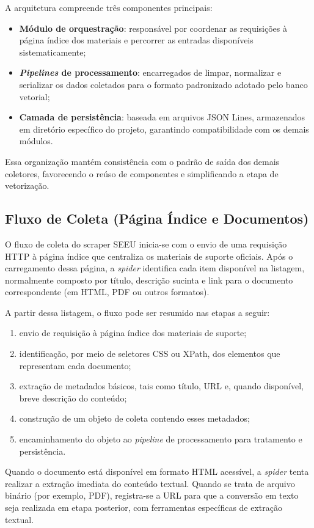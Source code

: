 A arquitetura compreende três componentes principais:
\begin{itemize}
  \item \textbf{Módulo de orquestração}: responsável por coordenar as requisições à página índice dos materiais e percorrer as entradas disponíveis sistematicamente;
  \item \textbf{\textit{Pipelines} de processamento}: encarregados de limpar, normalizar e serializar os dados coletados para o formato padronizado adotado pelo banco vetorial;
  \item \textbf{Camada de persistência}: baseada em arquivos JSON Lines, armazenados em diretório específico do projeto, garantindo compatibilidade com os demais módulos.
\end{itemize}

Essa organização mantém consistência com o padrão de saída dos demais coletores, favorecendo o reúso de componentes e simplificando a etapa de vetorização.

\subsection{Fluxo de Coleta (Página Índice e Documentos)}
O fluxo de coleta do scraper SEEU inicia-se com o envio de uma requisição HTTP à página índice que centraliza os materiais de suporte oficiais. Após o carregamento dessa página, a \textit{spider} identifica cada item disponível na listagem, normalmente composto por título, descrição sucinta e link para o documento correspondente (em HTML, PDF ou outros formatos).

A partir dessa listagem, o fluxo pode ser resumido nas etapas a seguir:
\begin{enumerate}
  \item envio de requisição à página índice dos materiais de suporte;
  \item identificação, por meio de seletores CSS ou XPath, dos elementos que representam cada documento;
  \item extração de metadados básicos, tais como título, URL e, quando disponível, breve descrição do conteúdo;
  \item construção de um objeto de coleta contendo esses metadados;
  \item encaminhamento do objeto ao \textit{pipeline} de processamento para tratamento e persistência.
\end{enumerate}

Quando o documento está disponível em formato HTML acessível, a \textit{spider} tenta realizar a extração imediata do conteúdo textual. Quando se trata de arquivo binário (por exemplo, PDF), registra-se a URL para que a conversão em texto seja realizada em etapa posterior, com ferramentas específicas de extração textual.

